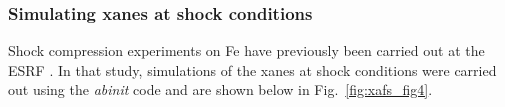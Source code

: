 \subsubsection{Simulating \gls{xanes} at shock conditions}
Shock compression experiments on Fe have previously been carried out at the ESRF
\cite{Torchio2016}. In that study,
simulations of the \gls{xanes} at shock conditions were carried out using the
\textit{abinit} code and are shown below in Fig.~\ref{fig:xafs_fig4}.
%
\begin{figure}
\end{figure}
